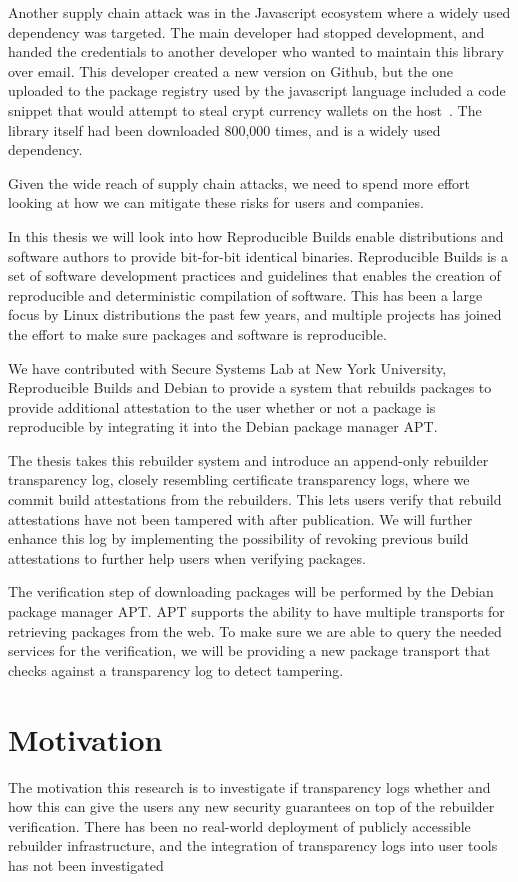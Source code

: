 \documentclass[../Main/thesis.tex]{subfiles}
\begin{document}
Another supply chain attack was in the Javascript ecosystem where a widely used
dependency was targeted. The main developer had stopped development, and handed
the credentials to another developer who wanted to maintain this library over
email. This developer created a new version on Github, but the one uploaded to
the package registry used by the javascript language included a code snippet
that would attempt to steal crypt currency wallets on the
host~\cite{malicious-npm}. The library itself had been downloaded 800,000 times,
and is a widely used dependency.

Given the wide reach of supply chain attacks, we need to spend more effort
looking at how we can mitigate these risks for users and companies.

In this thesis we will look into how Reproducible Builds enable distributions
and software authors to provide bit-for-bit identical binaries. Reproducible
Builds is a set of software development practices and guidelines that enables
the creation of reproducible and deterministic compilation of software. This has
been a large focus by Linux distributions the past few years, and multiple
projects has joined the effort to make sure packages and software is
reproducible.

We have contributed with Secure Systems Lab at New York University, Reproducible
Builds and Debian to provide a system that rebuilds packages to provide
additional attestation to the user whether or not a package is reproducible by
integrating it into the Debian package manager APT.

The thesis takes this rebuilder system and introduce an append-only rebuilder
transparency log, closely resembling certificate transparency logs, where we
commit build attestations from the rebuilders. This lets users verify that
rebuild attestations have not been tampered with after publication. We will
further enhance this log by implementing the possibility of revoking previous
build attestations to further help users when verifying packages.

The verification step of downloading packages will be performed by the Debian
package manager APT. APT supports the ability to have multiple transports for
retrieving packages from the web. To make sure we are able to query the needed
services for the verification, we will be providing a new package transport that
checks against a transparency log to detect tampering.

\section{Motivation}\label{sec:motivation}
The motivation this research is to investigate if transparency logs whether and
how this can give the users any new security guarantees on top of the rebuilder
verification. There has been no real-world deployment of publicly accessible
rebuilder infrastructure, and the integration of transparency logs into user
tools has not been investigated 
\end{document}
